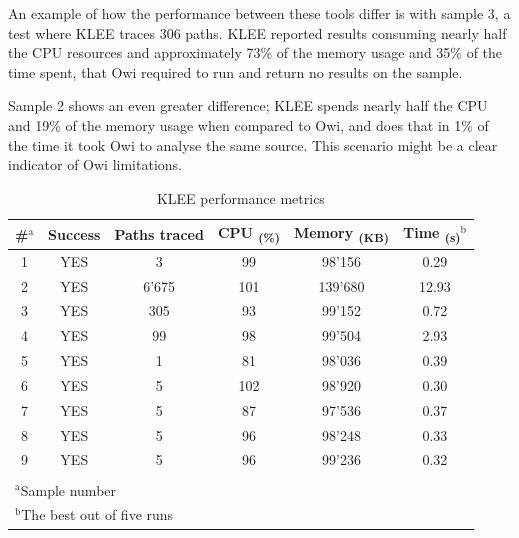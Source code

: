 An example of how the performance between these tools differ is with sample 3, a test where KLEE traces 306 paths. KLEE reported results consuming nearly half the CPU resources and approximately 73\% of the memory usage and 35\% of the time spent, that Owi required to run and return no results on the sample.

Sample 2 shows an even greater difference; KLEE spends nearly half the CPU and 19\% of the memory usage when compared to Owi, and does that in 1\% of the time it took Owi to analyse the same source. This scenario might be a clear indicator of Owi limitations.

\begin{table}[tb]
    \begin{center}
    \caption{KLEE performance metrics}
    \begin{tabular}{c|c|c|c|c|c}
        \#$^{\mathrm{a}}$ & Success & Paths traced & CPU \textsubscript{(\%)} & Memory \textsubscript{(KB)} & Time \textsubscript{(s)}$^{\mathrm{b}}$ \\
        \hline
        \hline
        1 & YES & 3 & 99 & 98'156 & 0.29 \\
        2 & YES & 6'675 & 101 & 139'680 & 12.93 \\
        3 & YES & 305 & 93 & 99'152 & 0.72 \\
        4 & YES & 99 & 98 & 99'504 & 2.93 \\
        5 & YES & 1 & 81 & 98'036 & 0.39 \\
        6 & YES & 5 & 102 & 98'920 & 0.30 \\
        7 & YES & 5 & 87 & 97'536 & 0.37 \\
        8 & YES & 5 & 96 & 98'248 & 0.33 \\
        9 & YES & 5 & 96 & 99'236 & 0.32 \\
        \hline
        \multicolumn{6}{l}{}\\
        \multicolumn{6}{l}{$^{\mathrm{a}}$\footnotesize{Sample number}} \\
        \multicolumn{6}{l}{$^{\mathrm{b}}$\footnotesize{The best out of five runs}}
    \end{tabular}
    \end{center}
    \label{tab:klee_performance}
\end{table}

